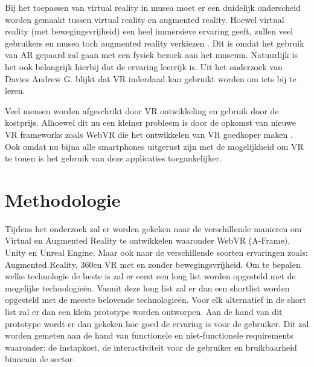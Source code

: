 Bij het toepassen van virtual reality in musea moet er een duidelijk onderscheid worden gemaakt tussen virtual reality en augmented reality. Hoewel virtual reality (met bewegingsvrijheid) een heel immersieve ervaring geeft, zullen veel gebruikers en musea toch augmented reality verkiezen \autocite{Kersten2017}. Dit is omdat het gebruik van AR gepaard zal gaan met een fysiek bezoek aan het museum. Natuurlijk is het ook belangrijk hierbij dat de ervaring leerrijk is. Uit het onderzoek van Davies Andrew G.\textcite{Davies2018} blijkt dat VR inderdaad kan gebruikt worden om iets bij te leren.

Veel mensen worden afgeschrikt door VR ontwikkeling en gebruik door de kostprijs. Alhoewel dit nu een kleiner probleem is door de opkomst van nieuwe VR frameworks zoals WebVR die het ontwikkelen van VR goedkoper maken \autocite{Dibbern2018}. Ook omdat nu bijna alle smartphones uitgerust zijn met de mogelijkheid om VR te tonen is het gebruik van deze applicaties toegankelijker.



\section{Methodologie}
\label{sec:methodologie}

Tijdens het onderzoek zal er worden gekeken naar de verschillende manieren om Virtual en Augmented Reality te ontwikkelen waaronder WebVR (A-Frame), Unity en Unreal Engine. Maar ook naar de verschillende soorten ervaringen zoals: Augmented Reality, 360\textdegree\space en VR met en zonder bewegingsvrijheid. 
Om te bepalen welke technologie de beste is zal er eerst een long list worden opgesteld met de mogelijke technologieën. Vanuit deze long list zal er dan een shortlist worden opgesteld met de meeste belovende technologieën. Voor elk alternatief in de short list zal er dan een klein prototype worden ontworpen. Aan de hand van dit prototype wordt er dan gekeken hoe goed de ervaring is voor de gebruiker. Dit zal worden gemeten aan de hand van functionele en niet-functionele requirements waaronder: de instapkost, de interactiviteit voor de gebruiker en bruikbaarheid binnenin de sector.


